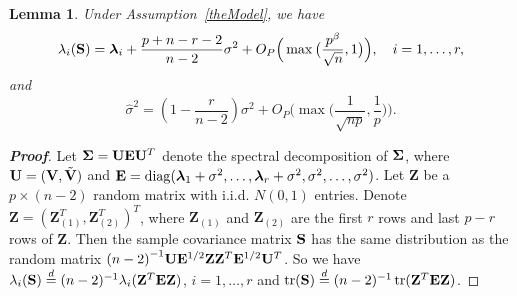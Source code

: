 \documentclass[3p]{elsarticle}
\DeclareMathOperator{\mytr}{tr}
\DeclareMathOperator{\mydiag}{diag}
\newcommand{\bZ}{\mathbf{Z}}
\newcommand{\bfsym}[1]{\ensuremath{\boldsymbol{#1}}}
\def\blambda {\bfsym {\lambda}}        \def\bLambda {\bfsym {\Lambda}}
\theoremstyle{plain}
\newtheorem{lemma}{\quad\quad Lemma}
\theoremstyle{definition}
\theoremstyle{remark}
\begin{document}
\begin{appendices}
\begin{lemma}\label{eigenconsisLemma}
    Under Assumption~\ref{theModel}, we have
    \begin{equation}\label{eigenconsisResult1}
        \lambda_i(\BS)= \blambda_i+\frac{p+n-r-2}{n-2}\sigma^2+
        O_P\Big(\max\big(\frac{p^{\beta}}{\sqrt{n}},1\big)\Big),\quad i=1,\ldots, r,
    \end{equation}
    and
    \begin{equation}\label{eigenconsisResult2}
        \hat{\sigma}^2=
(1-\frac{r}{n-2})\sigma^2+
O_P\Big(\max\big(\frac{1}{\sqrt{np}},\frac{1}{p}\big)\Big).
    \end{equation}
\end{lemma}
\begin{proof}[\textbf{Proof}]
    Let $\bSigma=\BU\BE\BU^T$ denote the spectral decomposition of $\bSigma$, where
     $\mathbf{U}=(\mathbf{V},\tilde{\mathbf{V}})$ and $\BE=\mydiag(\blambda_1+\sigma^2,\ldots,\blambda_r+\sigma^2,\sigma^2,\ldots,\sigma^2)$.
Let $\bZ$ be a $p\times (n-2)$ random matrix with i.i.d. $N(0,1)$ entries.
Denote $\bZ={(\bZ_{(1)}^T,\bZ_{(2)}^T)}^T$, where $\bZ_{(1)}$ and $\bZ_{(2)}$ are the first $r$ rows and last $p-r$ rows of $\bZ$. 
Then the sample covariance matrix $\mathbf{S}$ has the same distribution as the random matrix
$
    {(n-2)}^{-1} \BU \BE^{1/2} \bZ \bZ^T \BE^{1/2} \BU^T
$.
    So we have $\lambda_i(\BS)\overset{d}{=} (n-2)^{-1}\lambda_i(\bZ^T \BE \bZ)$, $i=1,\ldots,r$ and $\mytr(\BS)\overset{d}{=} (n-2)^{-1}\mytr(\BZ^T \BE \BZ)$.


\end{proof}
\end{appendices}
\end{document}
